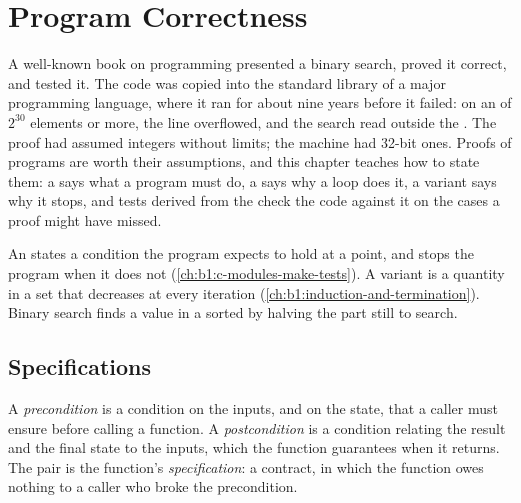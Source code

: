 \chapter{Program Correctness}\label{ch:b1:program-correctness}

A well-known book on programming presented a binary search, proved it correct, and tested it. The code was copied
into the standard library of a major programming language, where it ran for about nine years before it failed: on an
 of $2^{30}$ elements or more, the line  overflowed, and the search read outside the
. The proof had assumed integers without limits; the machine had 32-bit ones. Proofs of programs are worth their
assumptions, and this chapter teaches how to state them: a  says what a program must do, a  says why a loop does it, a variant says why it stops, and tests derived from the  check the
code against it on the cases a proof might have missed.

\begin{recall}
An  states a condition the program expects to hold at a point, and stops the program when it does not
(\cref{ch:b1:c-modules-make-tests}). A variant is a quantity in a  set that decreases at every iteration
(\cref{ch:b1:induction-and-termination}). Binary search finds a value in a sorted  by halving the part still to
search.
\end{recall}

\section{Specifications}\label{sec:b1:program-correctness:specifications}

\begin{definition}\label{def:b1:program-correctness:specification}
A \emph{precondition} is a condition on the inputs, and on the state, that a caller must ensure
before calling a function. A \emph{postcondition} is a condition relating the result and the final
state to the inputs, which the function guarantees when it returns. The pair is the function's
\emph{specification}: a contract, in which the function owes nothing to a caller who broke the
precondition.
\end{definition}

